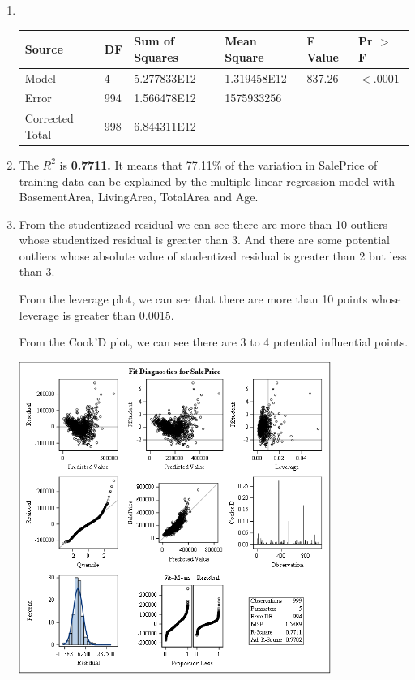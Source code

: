 \documentclass{article}
\begin{document}
\begin{enumerate}[leftmargin = 0 em, label = \arabic*., font = \bfseries]
\begin{center}
\begin{tabular}{*{6}{l}}
  \end{tabular}

\end{center}


	\item \

\begin{center}
\begin{tabular}{*{6}{l}}
\toprule
Source&DF&Sum of Squares&Mean Square&F Value&Pr $>$ F\\
\midrule
Model&4&5.277833E12&1.319458E12&837.26&$<.0001$\\
Error&994&1.566478E12&1575933256&&\\
Corrected Total&998&6.844311E12&&&\\
\bottomrule	
\end{tabular}
\end{center}

\item 
The $R^2$ is \textbf{0.7711.}
It means that 77.11\% of the variation in SalePrice of training data can be explained by the multiple linear regression model with BasementArea, LivingArea, TotalArea and Age.


\newpage
\item From the studentizaed residual we can see there are more than 10 outliers whose studentized residual is greater than 3. And there are some potential outliers whose absolute value of studentized residual is greater than 2 but less than 3.

From the leverage plot, we can see that there are more than 10 points whose leverage is greater than 0.0015.

From the Cook'D plot, we can see there are 3 to 4 potential influential points.

\begin{center}
\includegraphics[width = 0.8\textwidth]{fit.png}
\end{center}




\end{enumerate}
\end{document}
